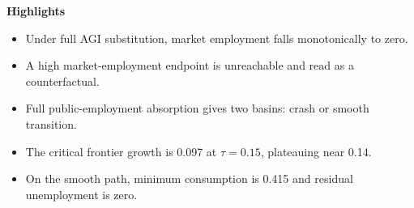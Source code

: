 \documentclass[11pt]{article}
\begin{document}
\noindent\textbf{Highlights}

\vspace{6pt}

\begin{itemize}[leftmargin=1.4em, itemsep=4pt]
\item Under full AGI substitution, market employment falls monotonically to zero.
\item A high market-employment endpoint is unreachable and read as a counterfactual.
\item Full public-employment absorption gives two basins: crash or smooth transition.
\item The critical frontier growth is 0.097 at $\tau=0.15$, plateauing near 0.14.
\item On the smooth path, minimum consumption is 0.415 and residual unemployment is zero.
\end{itemize}
\end{document}
